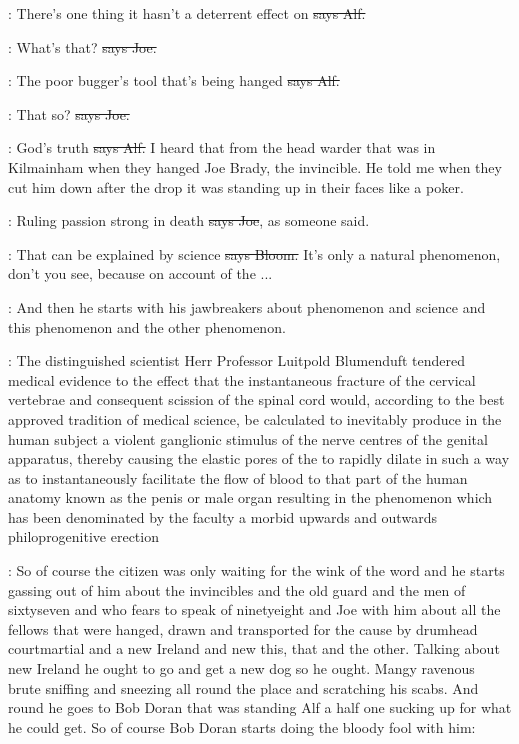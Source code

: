 \bergan:
There's one thing it hasn't a deterrent effect
on
\sout{says Alf.}

\joe:
What's that?
\sout{says Joe.}

\bergan:
The poor bugger's tool that's being hanged
\sout{says Alf.}

\joe:
That so?
\sout{says Joe.}

\bergan:
God's truth
\sout{says Alf.}
I heard that from the head warder that was in
Kilmainham when they hanged Joe Brady,
the invincible.
He told me when
they cut him down after the drop it was standing up in their faces like a
poker.

\joe:
Ruling passion strong in death
\sout{says Joe},
as someone said.

\Bloom:
That can be explained by science
\sout{says Bloom.}
It's only a natural
phenomenon,
don't you see,
because on account of the ...

\Nq:
And then he starts with his jawbreakers about phenomenon and
science and this phenomenon and the other phenomenon.

:
The distinguished scientist Herr Professor Luitpold Blumenduft
tendered medical evidence to the effect that the instantaneous fracture of
the cervical vertebrae
and consequent scission of the spinal cord would,
according to the best approved tradition of medical science,
be calculated
to inevitably produce in the human subject a violent ganglionic stimulus
of the nerve centres of the genital apparatus,
thereby causing the elastic
pores of the  to rapidly dilate in such a way as to
instantaneously facilitate the flow of blood to that part of the human
anatomy known as the penis or male organ resulting in the phenomenon which
has been denominated by the faculty a morbid upwards and outwards
philoprogenitive erection 

\Nq:
So of course the citizen was only waiting for the wink of the word and
he starts gassing out of him
about the invincibles and the old guard and
the men of sixtyseven and who fears to speak of ninetyeight and Joe with
him about all the fellows that were hanged,
drawn and transported for the
cause by drumhead courtmartial and a new Ireland and new this,
that and
the other.
Talking about new Ireland he ought to go and get a new dog so
he ought.
Mangy ravenous brute sniffing and sneezing all round the place
and scratching his scabs.
And round he goes to Bob Doran that was
standing Alf a half one sucking up for what he could get.
So of course Bob
Doran starts doing the bloody fool with him:

